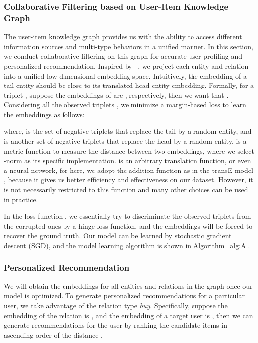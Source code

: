 \documentclass[algorithms,article,accept,moreauthors,pdftex,10pt,a4paper]{Definitions/mdpi}
\begin{document}
\subsubsection{Collaborative Filtering based on User-Item Knowledge Graph}
The user-item knowledge graph provides us with the ability to access different information sources and multi-type behaviors in a unified manner. In this section, we conduct collaborative filtering on this graph for accurate user profiling and personalized recommendation. Inspired by ~\cite{bordes2013translating}, we project each entity and relation into a unified low-dimensional embedding space. Intuitively, the embedding of a tail entity should be close to its translated head entity embedding. Formally, for a triplet , suppose the embeddings of  are , respectively, then we want that . 
Considering all the observed triplets , we minimize a margin-based loss to learn the embeddings as follows:

where,  is the set of negative triplets that replace the tail by a random entity, and  is another set of negative triplets that replace the head by a random entity.  is a metric function to measure the distance between two embeddings, where we select -norm as its specific implementation. 
 is an arbitrary translation function, or even a neural network, for here, we adopt the addition function  as in the transE model \cite{bordes2013translating}, because it gives us better efficiency and effectiveness on our dataset. However, it is not necessarily restricted to this function and many other choices can be used in practice.

In the loss function , we essentially try to discriminate the observed triplets from the corrupted ones by a hinge loss function, and the embeddings will be forced to recover the ground truth.
Our model can be learned by stochastic gradient descent (SGD), and the model learning algorithm is shown in Algorithm~\ref{alg:A}.



\subsubsection{Personalized Recommendation}
We will obtain the embeddings for all entities and relations in the graph once our model is optimized. To generate personalized recommendations for a particular user, we take advantage of the relation type \textit{buy}. Specifically, suppose the embedding of the relation  is , and the embedding of a target user is , then we can generate recommendations for the user by ranking the candidate items  in ascending order of the distance .
\fi
\end{document}
